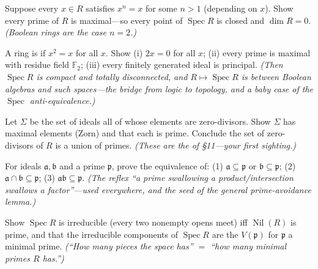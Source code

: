 \documentclass[11pt]{article}
\DeclareMathOperator{\Spec}{Spec}
\DeclareMathOperator{\Nil}{Nil}
\newcommand{\mfp}{\mathfrak{p}}
\newcommand{\mfa}{\mathfrak{a}}
\newcommand{\mfb}{\mathfrak{b}}
\begin{document}
\begin{xca}
Suppose every $x\in R$ satisfies $x^n=x$ for some $n>1$ (depending on $x$). Show every prime of
$R$ is maximal---so every point of $\Spec R$ is closed and $\dim R=0$. \emph{(Boolean rings are
the case $n=2$.)}
\end{xca}

\begin{xca}
A ring is  if $x^2=x$ for all $x$. Show (i) $2x=0$ for all $x$; (ii) every prime
is maximal with residue field $\mathbb{F}_2$; (iii) every finitely generated ideal is principal.
\emph{(Then $\Spec R$ is compact and totally disconnected, and $R\mapsto\Spec R$ is
 between Boolean algebras and such spaces---the bridge from logic to
topology, and a baby case of the $\Spec$ anti-equivalence.)}
\end{xca}

\begin{xca}
Let $\Sigma$ be the set of ideals all of whose elements are zero-divisors. Show $\Sigma$ has
maximal elements (Zorn) and that each is prime. Conclude the set of zero-divisors of $R$ is a
union of primes. \emph{(These are the  of \S11---your first sighting.)}
\end{xca}

\begin{xca}
For ideals $\mfa,\mfb$ and a prime $\mfp$, prove the equivalence of: (1) $\mfa\subseteq\mfp$ or
$\mfb\subseteq\mfp$; (2) $\mfa\cap\mfb\subseteq\mfp$; (3) $\mfa\mfb\subseteq\mfp$. \emph{(The
reflex ``a prime swallowing a product/intersection swallows a factor''---used everywhere, and
the seed of the general prime-avoidance lemma.)}
\end{xca}

\begin{xca}
Show $\Spec R$ is irreducible (every two nonempty opens meet) iff $\Nil(R)$ is prime, and that
the irreducible components of $\Spec R$ are the $V(\mfp)$ for $\mfp$ a minimal prime.
\emph{(``How many pieces the space has'' $=$ ``how many minimal primes $R$ has.'')}
\end{xca}
\end{document}
